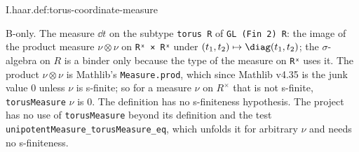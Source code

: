\begin{definition}
\bonly
{}
\end{definition}
\begin{tfformal}{I.haar.def:torus-coordinate-measure}
\begin{tffidelity}
B-only. The measure $\dd t$ on the subtype \texttt{torus R} of \texttt{GL (Fin 2) R}: the image of the product measure $\nu\otimes\nu$ on \texttt{Rˣ × Rˣ} under $(t_1,t_2)\mapsto\diag(t_1,t_2)$; the $\sigma$-algebra on $R$ is a binder only because the type of the measure on \texttt{Rˣ} uses it. The product $\nu\otimes\nu$ is Mathlib's \texttt{Measure.prod}, which since Mathlib v4.35 is the junk value $0$ unless $\nu$ is s-finite; so for a measure $\nu$ on $R^\times$ that is not s-finite, \texttt{torusMeasure} $\nu$ is $0$. The definition has no s-finiteness hypothesis. The project has no use of \texttt{torusMeasure} beyond its definition and the test \texttt{unipotentMeasure\_torusMeasure\_eq}, which unfolds it for arbitrary $\nu$ and needs no s-finiteness.
\end{tffidelity}
\end{tfformal}

